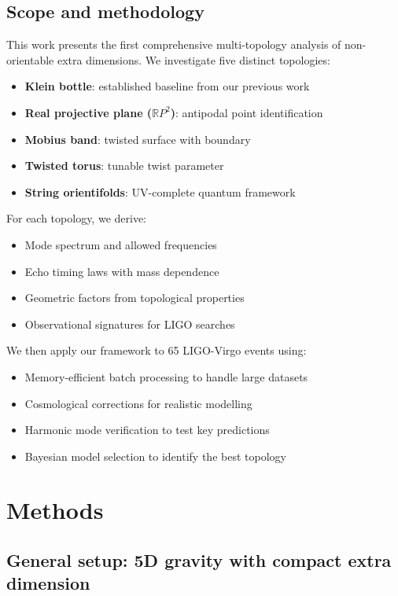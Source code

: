\documentclass[12pt]{article}
\begin{document}
\subsection{Scope and methodology}

This work presents the first comprehensive multi-topology analysis of non-orientable extra dimensions. We investigate five distinct topologies:

\begin{itemize}
\item \textbf{Klein bottle}: established baseline from our previous work
\item \textbf{Real projective plane ($\mathbb{R}P^2$)}: antipodal point identification
\item \textbf{Mobius band}: twisted surface with boundary
\item \textbf{Twisted torus}: tunable twist parameter
\item \textbf{String orientifolds}: UV-complete quantum framework
\end{itemize}

For each topology, we derive:
\begin{itemize}
\item Mode spectrum and allowed frequencies
\item Echo timing laws with mass dependence
\item Geometric factors from topological properties
\item Observational signatures for LIGO searches
\end{itemize}

We then apply our framework to 65 LIGO-Virgo events using:
\begin{itemize}
\item Memory-efficient batch processing to handle large datasets
\item Cosmological corrections for realistic modelling
\item Harmonic mode verification to test key predictions
\item Bayesian model selection to identify the best topology
\end{itemize}

\section{Methods}

\subsection{General setup: 5D gravity with compact extra dimension}
\end{document}
